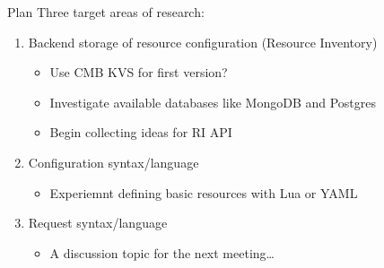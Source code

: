 \documentclass{beamer}
\begin{document}
\begin{frame}{Plan}
\visible<+->
\centering Three target areas of research:
\begin{enumerate}
 \item<+-> Backend storage of resource configuration (Resource Inventory)
 \begin{itemize}
   \item<+-> Use CMB KVS for first version?
   \item<+-> Investigate available databases like MongoDB and Postgres
   \item<+-> Begin collecting ideas for RI API
 \end{itemize}
 \item<+-> Configuration syntax/language
 \begin{itemize}
   \item <+-> Experiemnt defining basic resources with Lua or YAML
 \end{itemize}
 \item<+-> Request syntax/language
 \begin{itemize}
   \item<+-> A discussion topic for the next meeting\ldots
 \end{itemize}
\end{enumerate}
\end{frame}
\end{document}

